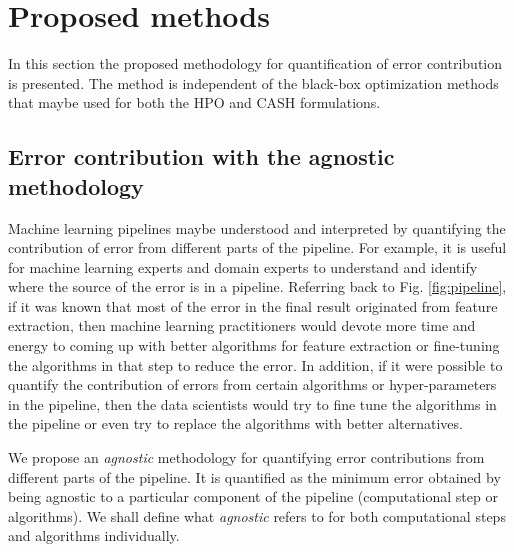 \section{Proposed methods}
\label{sec3}
In this section the proposed methodology for quantification of error contribution is presented. The method is independent of the black-box optimization methods that maybe used for both the HPO and CASH formulations.

\subsection{Error contribution with the agnostic methodology}
\label{EQ}
Machine learning pipelines maybe understood and interpreted by quantifying the contribution of error from different parts of the pipeline. For example, it is useful for machine learning experts and domain experts to understand and identify where the source of the error is in a pipeline. Referring back to Fig. \ref{fig:pipeline}, if it was known that most of the error in the final result originated from feature extraction, then machine learning practitioners would devote more time and energy to coming up with better algorithms for feature extraction or fine-tuning the algorithms in that step to reduce the error. In addition, if it were possible to quantify the contribution of errors from certain algorithms or hyper-parameters in the pipeline, then the data scientists would try to fine tune the algorithms in the pipeline or even try to replace the algorithms with better alternatives. 

We propose an \textit{agnostic} methodology for quantifying error contributions from different parts of the pipeline. It is quantified as the minimum error obtained by being agnostic to a particular component of the pipeline (computational step or algorithms). We shall define what \textit{agnostic} refers to for both computational steps and algorithms individually.

